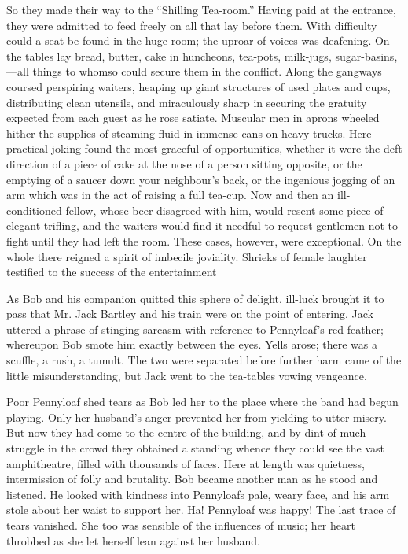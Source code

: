 So they made their way to the ``Shilling Tea-room.'' Having paid at the
entrance, they were admitted to feed freely on all that lay before them.
With difficulty could a seat be found in the huge room; the uproar of
voices was deafening. On the tables lay bread, butter, cake in
huncheons, tea-pots, milk-jugs, sugar-basins,---all things to whomso
could secure them in the conflict. Along the gangways coursed perspiring
waiters, heaping up giant structures of used plates and cups,
distributing clean utensils, and miraculously sharp in securing the
gratuity expected from each guest as he rose satiate. Muscular men in
aprons wheeled hither the supplies of steaming fluid in immense cans on
heavy trucks. Here practical joking found the most graceful of
opportunities, whether it were the deft direction of a piece of cake at
the nose of a person sitting opposite, or the emptying of a saucer down
your neighbour's back, or the ingenious
{\protect\hypertarget{263}{}{}}jogging of an arm which was in the act of
raising a full tea-cup. Now and then an ill-conditioned fellow, whose
beer disagreed with him, would resent some piece of elegant trifling,
and the waiters would find it needful to request gentlemen not to fight
until they had left the room. These cases, however, were exceptional. On
the whole there reigned a spirit of imbecile joviality. Shrieks of
female laughter testified to the success of the entertainment

As Bob and his companion quitted this sphere of delight, ill-luck
brought it to pass that Mr. Jack Bartley and his train were on the point
of entering. Jack uttered a phrase of stinging sarcasm with reference to
Pennyloaf's red feather; whereupon Bob smote him exactly between the
eyes. Yells arose; there was a scuffle, a rush, a tumult. The two were
separated before further harm came of the little misunderstanding, but
Jack went to the tea-tables vowing vengeance.

Poor Pennyloaf shed tears as Bob led her to the place where the band had
begun {\protect\hypertarget{264}{}{}}playing. Only her husband's anger
prevented her from yielding to utter misery. But now they had come to
the centre of the building, and by dint of much struggle in the crowd
they obtained a standing whence they could see the vast amphitheatre,
filled with thousands of faces. Here at length was quietness,
intermission of folly and brutality. Bob became another man as he stood
and listened. He looked with kindness into Pennyloafs pale, weary face,
and his arm stole about her waist to support her. Ha! Pennyloaf was
happy! The last trace of tears vanished. She too was sensible of the
influences of music; her heart throbbed as she let herself lean against
her husband.

